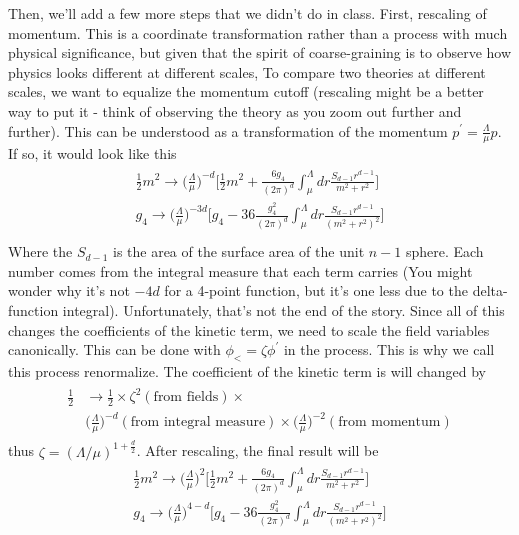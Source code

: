 \documentclass[12pt,halfline,a4paper]{ouparticle}
\begin{document}
Then, we'll add a few more steps that we didn't do in class.
First, rescaling of momentum. This is a coordinate transformation rather than a process with much physical significance, but given that the spirit of coarse-graining is to observe how physics looks different at different scales,
To compare two theories at different scales, we want to equalize the momentum cutoff (rescaling might be a better way to put it - think of observing the theory as you zoom out further and further).
This can be understood as a transformation of the momentum $p^\prime=\frac{\Lambda}{\mu}p$. 
If so, it would look like this
\begin{align}
	\begin{split}
		\frac{1}{2}m^2\rightarrow\bigg(\frac{\Lambda}{\mu}\bigg)^{-d}\bigg[\frac{1}{2} m^2+\frac{6g_4}{(2\pi)^d}\int^\Lambda_\mu dr\frac{S_{d-1}r^{d-1}}{m^2+r^2}\bigg]\\
		g_4\rightarrow\bigg(\frac{\Lambda}{\mu}\bigg)^{-3d}\bigg[g_4-36\frac{g_4^2}{(2\pi)^d}\int^\Lambda_\mu dr\frac{S_{d-1}r^{d-1}}{(m^2+r^2)^2}\bigg]\\
	\end{split}	
\end{align}
Where the $S_{d-1}$ is the area of the surface area of the unit $n-1$ sphere. Each number comes from the integral measure that each term carries (You might wonder why it's not $-4d$ for a 4-point function, but it's one less due to the delta-function integral).
Unfortunately, that's not the end of the story. Since all of this changes the coefficients of the kinetic term, we need to scale the field variables canonically. This can be done with $\phi_<=\zeta\phi^\prime$
in the process. This is why we call this process renormalize. The coefficient of the kinetic term is will changed by
\begin{align}
	\begin{split}
		\frac{1}{2} &\rightarrow \frac{1}{2}\times\zeta^{2}(\text{from fields})\times
		\\&\bigg(\frac{\Lambda}{\mu}\bigg)^{-d}(\text{from integral measure})\times\bigg(\frac{\Lambda}{\mu}\bigg)^{-2}(\text{from momentum})
	\end{split}
\end{align}
thus $\zeta=(\Lambda/\mu)^{1+\frac{d}{2}}$. After rescaling, the final result will be
\begin{align}
	\begin{split}
		\frac{1}{2}m^2\rightarrow\bigg(\frac{\Lambda}{\mu}\bigg)^{2}\bigg[\frac{1}{2} m^2+\frac{6g_4}{(2\pi)^d}\int^\Lambda_\mu dr\frac{S_{d-1}r^{d-1}}{m^2+r^2}\bigg]\\
		g_4\rightarrow\bigg(\frac{\Lambda}{\mu}\bigg)^{4-d}\bigg[g_4-36\frac{g_4^2}{(2\pi)^d}\int^\Lambda_\mu dr\frac{S_{d-1}r^{d-1}}{(m^2+r^2)^2}\bigg]\\
	\end{split}	
\end{align}
\end{document}
